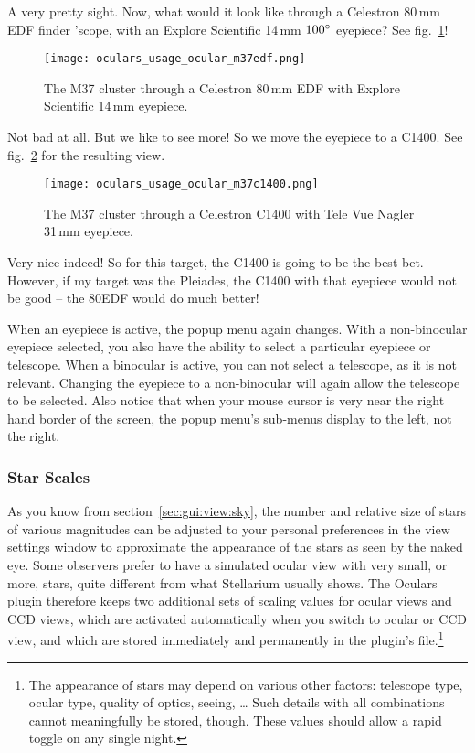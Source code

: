 \noindent A very pretty sight. Now, what would it look like through a Celestron 80\,mm EDF finder 'scope, with an Explore Scientific 14\,mm $100\degree$ eyepiece? See fig.~\ref{fig:plugins:Oculars:Usage:Ocular:M37EDF}!

\begin{figure}[h]\centering
\texttt{[image: oculars\_usage\_ocular\_m37edf.png]}
\caption{The M37 cluster through a Celestron 80\,mm EDF with Explore Scientific 14\,mm eyepiece.}
\label{fig:plugins:Oculars:Usage:Ocular:M37EDF}
\end{figure}

\noindent Not bad at all. But we like to see more! So we move the eyepiece to a C1400. See fig.~\ref{fig:plugins:Oculars:Usage:Ocular:M37C1400} for the resulting view.


\begin{figure}[ht]\centering
\texttt{[image: oculars\_usage\_ocular\_m37c1400.png]}
\caption{The M37 cluster through a Celestron C1400 with Tele Vue Nagler 31\,mm eyepiece.}
\label{fig:plugins:Oculars:Usage:Ocular:M37C1400}
\end{figure}

Very nice indeed! So for this target, the C1400 is going to be the best bet. However, if my target was the Pleiades, the C1400 with that eyepiece would not be good -- the 80EDF would do much better!

When an eyepiece is active, the popup menu again changes.  
With a non-binocular eyepiece selected, you also have the ability to select a particular eyepiece or telescope.
When a binocular is active, you can not select a telescope, as it is not relevant. 
Changing the eyepiece to a non-binocular will again allow the telescope to be selected. 
Also notice that when your mouse cursor is very near the right hand border of the screen, the popup menu's sub-menus display to the left, not the right.

\subsubsection{Star Scales}
As you know from section~\ref{sec:gui:view:sky}, the number and relative size of stars of various magnitudes 
can be adjusted to your personal preferences in the view settings window to approximate the appearance of the stars as seen by the naked eye. 
Some observers prefer to have a simulated ocular view with very small, or more, stars, quite different from what Stellarium usually shows. 
The Oculars plugin therefore keeps two additional sets of scaling values for ocular views and CCD views, which are activated 
automatically when you switch to ocular or CCD view, and which are stored immediately and permanently in the plugin's  file.\footnote{%
The appearance of stars may depend on various other factors: telescope type, ocular type, quality of optics, seeing, \ldots 
Such details with all combinations cannot meaningfully be stored, though. These values should allow a rapid toggle on any single night.}

